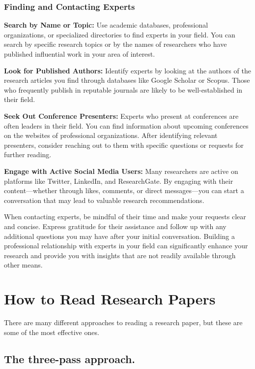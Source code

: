 \documentclass[
]{book}
\begin{document}
\subsubsection*{Finding and Contacting Experts}\label{finding-and-contacting-experts}

\textbf{Search by Name or Topic:} Use academic databases, professional organizations, or specialized directories to find experts in your field. You can search by specific research topics or by the names of researchers who have published influential work in your area of interest.

\textbf{Look for Published Authors:} Identify experts by looking at the authors of the research articles you find through databases like Google Scholar or Scopus. Those who frequently publish in reputable journals are likely to be well-established in their field.

\textbf{Seek Out Conference Presenters:} Experts who present at conferences are often leaders in their field. You can find information about upcoming conferences on the websites of professional organizations. After identifying relevant presenters, consider reaching out to them with specific questions or requests for further reading.

\textbf{Engage with Active Social Media Users:} Many researchers are active on platforms like Twitter, LinkedIn, and ResearchGate. By engaging with their content---whether through likes, comments, or direct messages---you can start a conversation that may lead to valuable research recommendations.

When contacting experts, be mindful of their time and make your requests clear and concise. Express gratitude for their assistance and follow up with any additional questions you may have after your initial conversation. Building a professional relationship with experts in your field can significantly enhance your research and provide you with insights that are not readily available through other means.

\section{How to Read Research Papers}\label{read}

There are many different approaches to reading a research paper, but these are some of the most effective ones.

\subsection*{The three-pass approach.}\label{the-three-pass-approach.}
\end{document}

